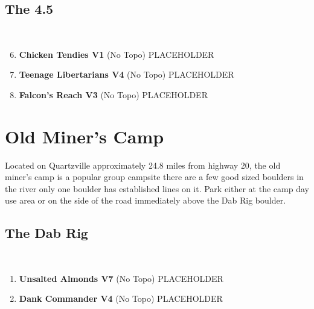\subsection*{The 4.5}\label{bf:The 4.5}
\

\begin{enumerate}[]
	\setcounter{enumi}{5}
	\item\label{rt:Chicken Tendies} \colorbox{green!20}{\textbf{Chicken Tendies V1   } }
	\newline (No Topo) 
	\newline PLACEHOLDER\
	\setcounter{enumi}{6}
	\item\label{rt:Teenage Libertarians} \colorbox{RoyalBlue!20}{\textbf{Teenage Libertarians V4     } }
	\newline (No Topo) 
	\newline PLACEHOLDER\
	\setcounter{enumi}{7}
	\item\label{rt:Falcon's Reach} \colorbox{green!20}{\textbf{Falcon's Reach V3   } }
	\newline (No Topo) 
	\newline PLACEHOLDER\
\end{enumerate}
\section{Old Miner's Camp}\label{sa:Old Miner's Camp}
Located on Quartzville approximately 24.8 miles from highway 20, the old miner's camp is a popular group campsite there are a few good sized boulders in the river only one boulder has established lines on it. Park either at the camp day use area or on the side of the road immediately above the Dab Rig boulder.
\subsection*{The Dab Rig}\label{bf:The Dab Rig}
\

\begin{enumerate}[]
	\setcounter{enumi}{0}
	\item\label{rt:Unsalted Almonds} \colorbox{Goldenrod!50}{\textbf{Unsalted Almonds V7  } }
	\newline (No Topo) 
	\newline PLACEHOLDER\
	\setcounter{enumi}{1}
	\item\label{rt:Dank Commander} \colorbox{RoyalBlue!20}{\textbf{Dank Commander V4  } }
	\newline (No Topo) 
	\newline PLACEHOLDER\
\end{enumerate}
\clearpage